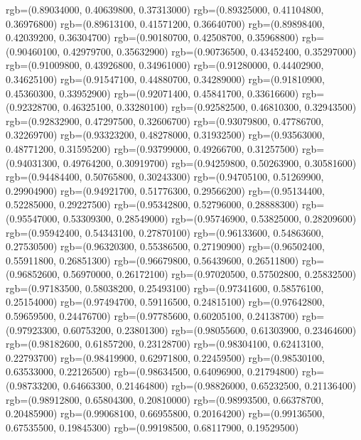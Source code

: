 {{        rgb=(0.89034000, 0.40639800, 0.37313000)
        rgb=(0.89325000, 0.41104800, 0.36976800)
        rgb=(0.89613100, 0.41571200, 0.36640700)
        rgb=(0.89898400, 0.42039200, 0.36304700)
        rgb=(0.90180700, 0.42508700, 0.35968800)
        rgb=(0.90460100, 0.42979700, 0.35632900)
        rgb=(0.90736500, 0.43452400, 0.35297000)
        rgb=(0.91009800, 0.43926800, 0.34961000)
        rgb=(0.91280000, 0.44402900, 0.34625100)
        rgb=(0.91547100, 0.44880700, 0.34289000)
        rgb=(0.91810900, 0.45360300, 0.33952900)
        rgb=(0.92071400, 0.45841700, 0.33616600)
        rgb=(0.92328700, 0.46325100, 0.33280100)
        rgb=(0.92582500, 0.46810300, 0.32943500)
        rgb=(0.92832900, 0.47297500, 0.32606700)
        rgb=(0.93079800, 0.47786700, 0.32269700)
        rgb=(0.93323200, 0.48278000, 0.31932500)
        rgb=(0.93563000, 0.48771200, 0.31595200)
        rgb=(0.93799000, 0.49266700, 0.31257500)
        rgb=(0.94031300, 0.49764200, 0.30919700)
        rgb=(0.94259800, 0.50263900, 0.30581600)
        rgb=(0.94484400, 0.50765800, 0.30243300)
        rgb=(0.94705100, 0.51269900, 0.29904900)
        rgb=(0.94921700, 0.51776300, 0.29566200)
        rgb=(0.95134400, 0.52285000, 0.29227500)
        rgb=(0.95342800, 0.52796000, 0.28888300)
        rgb=(0.95547000, 0.53309300, 0.28549000)
        rgb=(0.95746900, 0.53825000, 0.28209600)
        rgb=(0.95942400, 0.54343100, 0.27870100)
        rgb=(0.96133600, 0.54863600, 0.27530500)
        rgb=(0.96320300, 0.55386500, 0.27190900)
        rgb=(0.96502400, 0.55911800, 0.26851300)
        rgb=(0.96679800, 0.56439600, 0.26511800)
        rgb=(0.96852600, 0.56970000, 0.26172100)
        rgb=(0.97020500, 0.57502800, 0.25832500)
        rgb=(0.97183500, 0.58038200, 0.25493100)
        rgb=(0.97341600, 0.58576100, 0.25154000)
        rgb=(0.97494700, 0.59116500, 0.24815100)
        rgb=(0.97642800, 0.59659500, 0.24476700)
        rgb=(0.97785600, 0.60205100, 0.24138700)
        rgb=(0.97923300, 0.60753200, 0.23801300)
        rgb=(0.98055600, 0.61303900, 0.23464600)
        rgb=(0.98182600, 0.61857200, 0.23128700)
        rgb=(0.98304100, 0.62413100, 0.22793700)
        rgb=(0.98419900, 0.62971800, 0.22459500)
        rgb=(0.98530100, 0.63533000, 0.22126500)
        rgb=(0.98634500, 0.64096900, 0.21794800)
        rgb=(0.98733200, 0.64663300, 0.21464800)
        rgb=(0.98826000, 0.65232500, 0.21136400)
        rgb=(0.98912800, 0.65804300, 0.20810000)
        rgb=(0.98993500, 0.66378700, 0.20485900)
        rgb=(0.99068100, 0.66955800, 0.20164200)
        rgb=(0.99136500, 0.67535500, 0.19845300)
        rgb=(0.99198500, 0.68117900, 0.19529500)
}}
